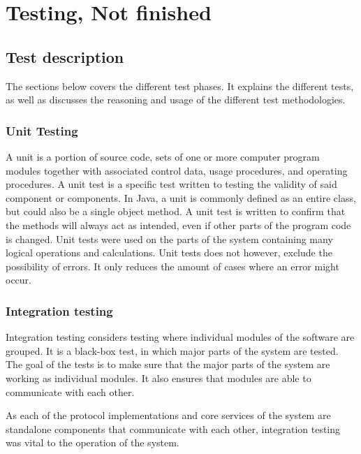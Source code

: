 
\chapter{Testing, Not finished}
\label{ch:testing}

\section{Test description}
\label{sec:testing-test_description}

The sections below covers the different test phases. It explains the different tests, as well as discusses the reasoning and usage of the different test methodologies.

\subsection{Unit Testing}
\label{subsec:testing-test_description-unit_testing}

A unit is a portion of source code, sets of one or more computer program modules together with associated control data, usage procedures, and operating procedures. A unit test is a specific test written to testing the validity of said component or components. In Java, a unit is commonly defined as an entire class, but could also be a single object method. A unit test is written to confirm that the methods will always act as intended, even if other parts of the program code is changed. Unit tests were used on the parts of the system containing many logical operations and calculations. Unit tests does not however, exclude the possibility of errors. It only reduces the amount of cases where an error might occur.

\subsection{Integration testing}
\label{subsec:testing-test_description-integration_testing}

Integration testing considers testing where individual modules of the software are grouped. It is a black-box test, in which major parts of the system are tested. The goal of the tests is to make sure that the major parts of the system are working as individual modules. It also ensures that modules are able to communicate with each other.

As each of the protocol implementations and core services of the system are standalone components that communicate with each other, integration testing was vital to the operation of the system. 


